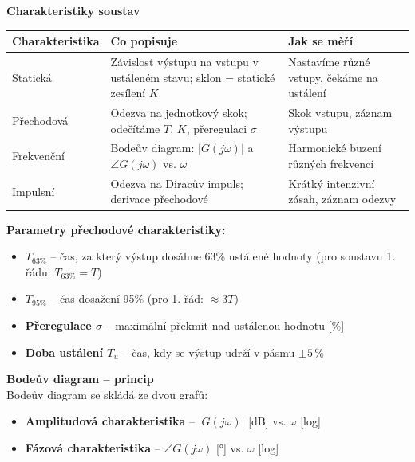 \documentclass[a4paper,10pt]{article}
\begin{document}
\begin{vysvetlenibox}
\textbf{Charakteristiky soustav}

\begin{center}
\begin{tabularx}{0.95\linewidth}{@{} l X X @{}}
    \toprule
    \textbf{Charakteristika} & \textbf{Co popisuje} & \textbf{Jak se měří} \\
    \midrule
    Statická & Závislost výstupu na vstupu v ustáleném stavu;
               sklon = statické zesílení $K$
             & Nastavíme různé vstupy, čekáme na ustálení \\
    Přechodová & Odezva na jednotkový skok;
                 odečítáme $T$, $K$, přeregulaci $\sigma$
              & Skok vstupu, záznam výstupu \\
    Frekvenční & Bodeův diagram: $|G(j\omega)|$ a $\angle G(j\omega)$ vs. $\omega$
              & Harmonické buzení různých frekvencí \\
    Impulsní & Odezva na Diracův impuls; derivace přechodové
              & Krátký intenzivní zásah, záznam odezvy \\
    \bottomrule
\end{tabularx}
\end{center}

\textbf{Parametry přechodové charakteristiky:}
\begin{itemize}[noitemsep, leftmargin=1.4em, topsep=4pt]
    \item \textbf{$T_{63\%}$} -- čas, za který výstup dosáhne 63\% ustálené hodnoty
          (pro soustavu 1. řádu: $T_{63\%} = T$)
    \item \textbf{$T_{95\%}$} -- čas dosažení 95\% (pro 1. řád: $\approx 3T$)
    \item \textbf{Přeregulace $\sigma$} -- maximální překmit nad ustálenou hodnotu [\%]
    \item \textbf{Doba ustálení $T_u$} -- čas, kdy se výstup udrží v pásmu $\pm 5\,\%$
\end{itemize}

\textbf{Bodeův diagram -- princip}\\
Bodeův diagram se skládá ze dvou grafů:
\begin{itemize}[noitemsep, leftmargin=1.4em, topsep=4pt]
    \item \textbf{Amplitudová charakteristika} -- $|G(j\omega)|$ [dB] vs. $\omega$ [log]
    \item \textbf{Fázová charakteristika} -- $\angle G(j\omega)$ [°] vs. $\omega$ [log]
\end{itemize}


\end{vysvetlenibox}
\end{document}
